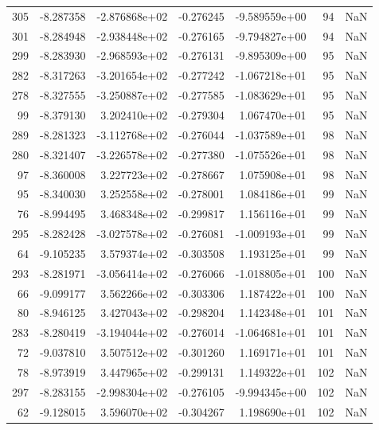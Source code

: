 \begin{tabular}{rrrrrrr}
 305 &  -8.287358 & -2.876868e+02 & -0.276245 & -9.589559e+00 &          94 & NaN \\
 301 &  -8.284948 & -2.938448e+02 & -0.276165 & -9.794827e+00 &          94 & NaN \\
 299 &  -8.283930 & -2.968593e+02 & -0.276131 & -9.895309e+00 &          95 & NaN \\
 282 &  -8.317263 & -3.201654e+02 & -0.277242 & -1.067218e+01 &          95 & NaN \\
 278 &  -8.327555 & -3.250887e+02 & -0.277585 & -1.083629e+01 &          95 & NaN \\
  99 &  -8.379130 &  3.202410e+02 & -0.279304 &  1.067470e+01 &          95 & NaN \\
 289 &  -8.281323 & -3.112768e+02 & -0.276044 & -1.037589e+01 &          98 & NaN \\
 280 &  -8.321407 & -3.226578e+02 & -0.277380 & -1.075526e+01 &          98 & NaN \\
  97 &  -8.360008 &  3.227723e+02 & -0.278667 &  1.075908e+01 &          98 & NaN \\
  95 &  -8.340030 &  3.252558e+02 & -0.278001 &  1.084186e+01 &          99 & NaN \\
  76 &  -8.994495 &  3.468348e+02 & -0.299817 &  1.156116e+01 &          99 & NaN \\
 295 &  -8.282428 & -3.027578e+02 & -0.276081 & -1.009193e+01 &          99 & NaN \\
  64 &  -9.105235 &  3.579374e+02 & -0.303508 &  1.193125e+01 &          99 & NaN \\
 293 &  -8.281971 & -3.056414e+02 & -0.276066 & -1.018805e+01 &         100 & NaN \\
  66 &  -9.099177 &  3.562266e+02 & -0.303306 &  1.187422e+01 &         100 & NaN \\
  80 &  -8.946125 &  3.427043e+02 & -0.298204 &  1.142348e+01 &         101 & NaN \\
 283 &  -8.280419 & -3.194044e+02 & -0.276014 & -1.064681e+01 &         101 & NaN \\
  72 &  -9.037810 &  3.507512e+02 & -0.301260 &  1.169171e+01 &         101 & NaN \\
  78 &  -8.973919 &  3.447965e+02 & -0.299131 &  1.149322e+01 &         102 & NaN \\
 297 &  -8.283155 & -2.998304e+02 & -0.276105 & -9.994345e+00 &         102 & NaN \\
  62 &  -9.128015 &  3.596070e+02 & -0.304267 &  1.198690e+01 &         102 & NaN \\

\end{tabular}
